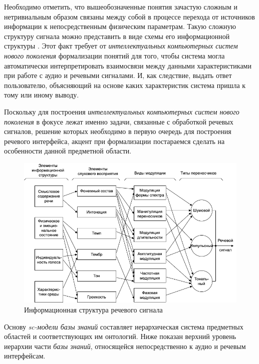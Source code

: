 Необходимо отметить, что вышеобозначенные понятия зачастую сложным и нетривиальным образом связаны между собой в процессе перехода от источников информации к непосредственным физическим параметрам. Такую сложную структуру сигнала можно представить в виде схемы его информационной структуры \textit{}. Этот факт требует от \textit{интеллектуальных компьютерных систем нового поколения} формализации понятий для того, чтобы система могла автоматически интерпретировать взаимосвязи между данными характеристиками при работе с аудио и речевыми сигналами. И, как следствие, выдать ответ пользователю, объясняющий на основе каких характеристик система пришла к тому или иному выводу. 

Поскольку для построения \textit{интеллектуальных компьютерных систем нового поколения} в фокусе лежат именно задачи, связанные с обработкой речевых сигналов, решение которых необходимо в первую очередь для построения речевого интерфейса, акцент при формализации постараемся сделать на особенности данной предметной области.

\begin{figure}[H]
    \centerline{
        \includegraphics[scale=0.8, width=1.0\textwidth]{author/part4/figures/ch43_fig03_speech-signal-inf-structure-ru.png}
    }
    \caption{Информационная структура речевого сигнала \cite{Lobanov2006}}
    \label{fig:speech-signal-inf-structure-ru}
\end{figure}

Основу \textit{sc-модели базы знаний} составляет иерархическая система предметных областей и соответствующих им онтологий. Ниже показан верхний уровень иерархии части \textit{базы знаний}, относящейся непосредственно к аудио и речевым интерфейсам.

